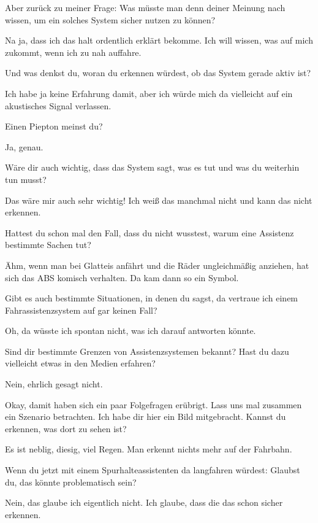 \interviewerin
Aber zurück zu meiner Frage: Was müsste man denn deiner Meinung nach
wissen, um ein solches System sicher nutzen zu können?

Na ja, dass ich das halt ordentlich erklärt bekomme. Ich will wissen,
was auf mich zukommt, wenn ich zu nah auffahre.

\interviewerin
Und was denkst du, woran du erkennen würdest, ob das System gerade
aktiv ist?

Ich habe ja keine Erfahrung damit, aber ich würde mich da vielleicht
auf ein akustisches Signal verlassen.

\interviewerin
Einen Piepton meinst du?

Ja, genau.

\interviewerin
Wäre dir auch wichtig, dass das System sagt, was es tut und was du
weiterhin tun musst?

Das wäre mir auch sehr wichtig! Ich weiß das manchmal nicht und kann
das nicht erkennen.

\interviewerin
Hattest du schon mal den Fall, dass du nicht wusstest, warum eine
Assistenz bestimmte Sachen tut?

Ähm, wenn man bei Glatteis anfährt und die Räder ungleichmäßig
anziehen, hat sich das ABS komisch verhalten. Da kam dann so ein Symbol.

\interviewerin
Gibt es auch bestimmte Situationen, in denen du sagst, da vertraue ich
einem Fahrassistenzsystem auf gar keinen Fall?

Oh, da wüsste ich spontan nicht, was ich darauf antworten könnte.

\interviewerin
Sind dir bestimmte Grenzen von Assistenzsystemen bekannt? Hast du dazu
vielleicht etwas in den Medien erfahren?

Nein, ehrlich gesagt nicht.

\interviewerin
Okay, damit haben sich ein paar Folgefragen erübrigt. Lass uns mal
zusammen ein Szenario betrachten. Ich habe dir hier ein Bild
mitgebracht. Kannst du erkennen, was dort zu sehen ist?

Es ist neblig, diesig, viel Regen. Man erkennt nichts mehr auf der
Fahrbahn.

\interviewerin
Wenn du jetzt mit einem Spurhalteassistenten da langfahren würdest:
Glaubst du, das könnte problematisch sein?

Nein, das glaube ich eigentlich nicht. Ich glaube, dass die das schon
sicher erkennen.

